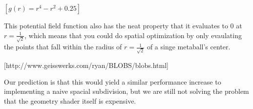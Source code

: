 \documentclass{article}
\begin{document}
        $[g(r) = r^4 - r^2 + 0.25]$

        This potential field function also has the neat property that it evaluates to 0 at $r=\frac{1}{\sqrt{2}}$, which means that you could do spatial optimization by only evaulating the points that fall within the radius of $r=\frac{1}{\sqrt{2}}$ of a singe metaball's center.

        [http://www.geisswerks.com/ryan/BLOBS/blobs.html]

        Our prediction is that this would yield a similar performance increase to implementing a naive spacial subdivision, but we are still not solving the problem that the geometry shader itself is expensive.
\end{document}
